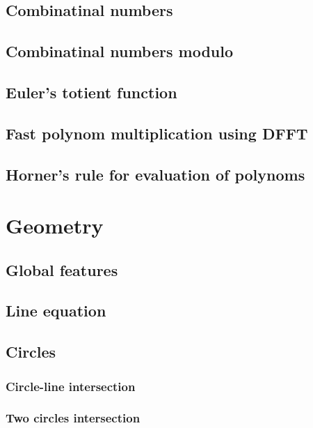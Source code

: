 \documentclass[a4paper]{article}
\begin{document}
\begin{multicols*}{2}
    \subsection{Combinatinal numbers}
        
    \subsection{Combinatinal numbers modulo}
        
    \subsection{Euler's totient function}
        
    \subsection{Fast polynom multiplication using DFFT}
        
    \subsection{Horner's rule for evaluation of polynoms}
        

\section{Geometry}
    \subsection{Global features}
        
    \subsection{Line equation}
        
    \subsection{Circles}
        \subsubsection{Circle-line intersection}
            
        \subsubsection{Two circles intersection}
            

\end{multicols*}
\end{document}
